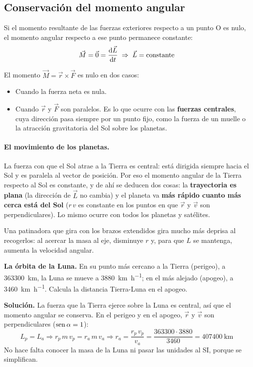 \subsection{Conservación del momento angular}

\begin{definition}
    Si el momento resultante de las fuerzas exteriores respecto a un punto O es nulo, el momento angular respecto a ese punto
    permanece constante:
    \[ \vec{M} = \vec{0} = \frac{\mathrm{d}\vec{L}}{\mathrm{d} t} \;\Rightarrow\; \vec{L} = \text{constante} \]
\end{definition}

El momento \(\vec{M} = \vec{r} \times \vec{F}\) es nulo en dos casos:
\begin{itemize}
    \item Cuando la fuerza neta es nula.
    \item Cuando \(\vec{r}\) y \(\vec{F}\) son paralelos. Es lo que ocurre con las \textbf{fuerzas centrales}, cuya dirección pasa siempre
    por un punto fijo, como la fuerza de un muelle o la atracción gravitatoria del Sol sobre los planetas.
\end{itemize}

\paragraph{El movimiento de los planetas.} La fuerza con que el Sol atrae a la Tierra es central: está dirigida siempre hacia el Sol
y es paralela al vector de posición. Por eso el momento angular de la Tierra respecto al Sol es constante, y de ahí se deducen dos
cosas: la \textbf{trayectoria es plana} (la dirección de \(\vec{L}\) no cambia) y el planeta va \textbf{más rápido cuanto más cerca
está del Sol} (\(r\,v\) es constante en los puntos en que \(\vec{r}\) y \(\vec{v}\) son perpendiculares). Lo mismo ocurre con todos los
planetas y satélites.

\begin{remark}
    Una patinadora que gira con los brazos extendidos gira mucho más deprisa al recogerlos: al acercar la masa al eje, disminuye
    \(r\) y, para que \(L\) se mantenga, aumenta la velocidad angular.
\end{remark}

\begin{example}
    \textbf{La órbita de la Luna.} En su punto más cercano a la Tierra (perigeo), a \qty{363300}{\km}, la Luna se mueve a
    \qty{3880}{\km\per\hour}; en el más alejado (apogeo), a \qty{3460}{\km\per\hour}. Calcula la distancia Tierra-Luna en el apogeo.

    \textbf{Solución.} La fuerza que la Tierra ejerce sobre la Luna es central, así que el momento angular se conserva. En el perigeo
    y en el apogeo, \(\vec{r}\) y \(\vec{v}\) son perpendiculares (\(\operatorname{sen}\alpha = 1\)):
    \[ L_p = L_a \Rightarrow r_p\,m\,v_p = r_a\,m\,v_a \Rightarrow r_a = \frac{r_p\,v_p}{v_a} = \frac{363300 \cdot 3880}{3460} = \qty{407400}{\km} \]
    No hace falta conocer la masa de la Luna ni pasar las unidades al SI, porque se simplifican.
\end{example}


